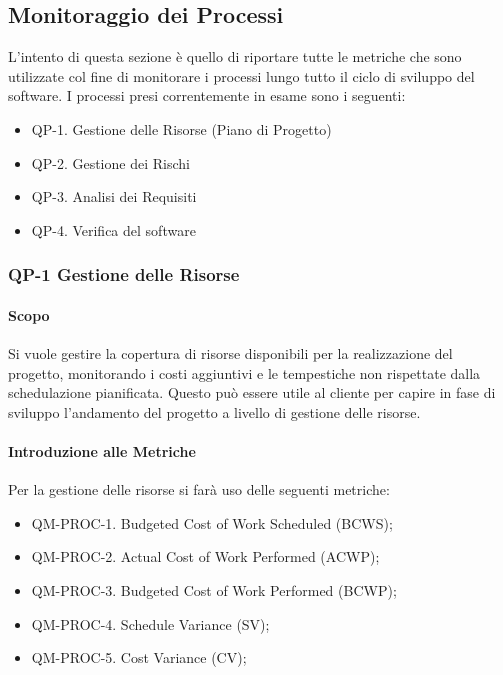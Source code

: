 \subsection{Monitoraggio dei Processi}

L'intento di questa sezione è quello di riportare tutte le metriche che sono utilizzate col fine di monitorare i processi lungo tutto il ciclo di sviluppo del software. I processi presi correntemente in esame sono i seguenti:

\begin{itemize}
	\item QP-1. Gestione delle Risorse (Piano di Progetto)
	\item QP-2. Gestione dei Rischi
	\item QP-3. Analisi dei Requisiti
	\item QP-4. Verifica del software
\end{itemize}

	\subsubsection{QP-1 Gestione delle Risorse}

		\paragraph{Scopo}

		Si vuole gestire la copertura di risorse disponibili per la realizzazione del progetto, monitorando i costi aggiuntivi e le tempestiche non rispettate dalla schedulazione pianificata. Questo può essere utile al cliente per capire in fase di sviluppo l'andamento del progetto a livello di gestione delle risorse.

		\paragraph{Introduzione alle Metriche}

		Per la gestione delle risorse si farà uso delle seguenti metriche:

		\begin{itemize}
			\item QM-PROC-1. Budgeted Cost of Work Scheduled (BCWS);
			\item QM-PROC-2. Actual Cost of Work Performed (ACWP);
			\item QM-PROC-3. Budgeted Cost of Work Performed (BCWP);
			\item QM-PROC-4. Schedule Variance (SV);
			\item QM-PROC-5. Cost Variance (CV);
		\end{itemize}

